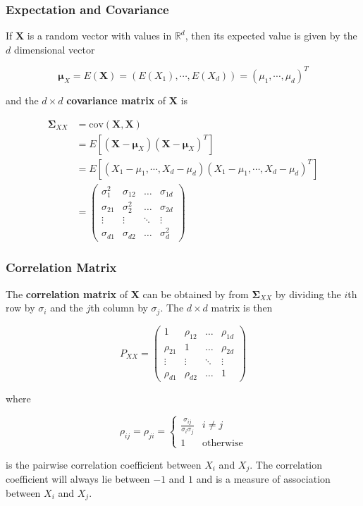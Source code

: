\documentclass{beamer}
\begin{document}
\begin{frame}
\frametitle{Expectation and Covariance}
If $\mathbf{X}$ is a random vector with values in $\mathbb{R}^d$, then its expected value is given by the $d$ dimensional vector

$$\mathbf{\mu}_X = E(\mathbf{X}) = (E(X_1), \cdots, E(X_d)) = (\mu_1, \cdots, \mu_d)^T$$

and the $d \times d$ \textbf{covariance matrix} of $\mathbf{X}$ is 

\begin{align*}
\mathbf{\Sigma}_{XX} &= \text{cov}(\mathbf{X}, \mathbf{X}) \\
&= E[(\mathbf{X} - \mathbf{\mu}_X)(\mathbf{X} - \mathbf{\mu}_X)^T]\\
&= E[(X_1 - \mu_1, \cdots, X_d - \mu_d) (X_1 - \mu_1, \cdots, X_d - \mu_d)^T]\\
&= 
\begin{pmatrix}
    \sigma_1^2 & \sigma_{12} & \dots  & \sigma_{1d}\\
    \sigma_{21} & \sigma_2^2  & \dots  & \sigma_{2d}\\
    \vdots & \vdots  & \ddots & \vdots \\
    \sigma_{d1} & \sigma_{d2}  & \dots  & \sigma_d^2
\end{pmatrix}
\end{align*} 
\end{frame}

\begin{frame}
\frametitle{Correlation Matrix}
The \textbf{correlation matrix} of $\mathbf{X}$ can be obtained by from $\mathbf{\Sigma}_{XX}$ by dividing the $i$th row by $\sigma_i$ and the $j$th column by $\sigma_j$.  The $d \times d$ matrix is then

$$P_{XX} = \begin{pmatrix}
    1 & \rho_{12} & \dots  & \rho_{1d}\\
    \rho_{21} & 1  & \dots  & \rho_{2d}\\
    \vdots & \vdots  & \ddots & \vdots \\
    \rho_{d1} & \rho_{d2}  & \dots  & 1
\end{pmatrix}$$

where 

$$\rho_{ij} = \rho_{ji} = \begin{cases}
\frac{\sigma_{ij}}{\sigma_i \sigma_j} & i \neq j\\
1 & \text{otherwise}
\end{cases}
$$

is the pairwise correlation coefficient between $X_i$ and $X_j$.  The correlation coefficient will always lie between $-1$ and $1$ and is a measure of association between $X_i$ and $X_j$.
\end{frame}
\end{document}
